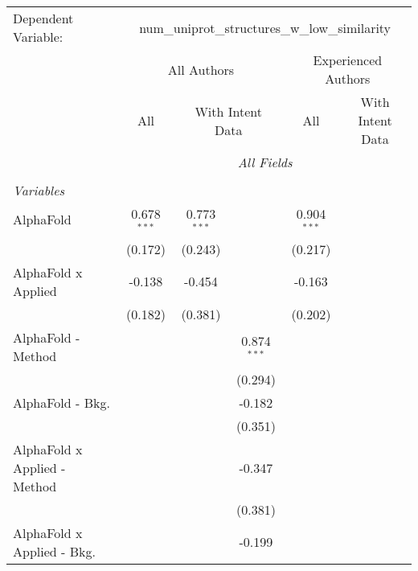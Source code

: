 \begingroup
\centering
\begin{tabular}{lcccccc}
   \tabularnewline \midrule \midrule
   Dependent Variable: & \multicolumn{6}{c}{num\_uniprot\_structures\_w\_low\_similarity}\\
 & \multicolumn{3}{c}{All Authors} & \multicolumn{3}{c}{Experienced Authors} \\
\cmidrule(lr){2-4} \cmidrule(lr){5-7}
 & \multicolumn{1}{c}{All} & \multicolumn{2}{c}{With Intent Data} & \multicolumn{1}{c}{All} & \multicolumn{2}{c}{With Intent Data} \\
\cmidrule(lr){2-2} \cmidrule(lr){3-4} \cmidrule(lr){5-5} \cmidrule(lr){6-7}
 & \multicolumn{6}{c}{\textit{All Fields}} \\ \\
   \emph{Variables}\\
   AlphaFold                      & 0.678$^{***}$  & 0.773$^{***}$ &               & 0.904$^{***}$ &         &   \\   
                                  & (0.172)        & (0.243)       &               & (0.217)       &         &   \\   
   AlphaFold x Applied            & -0.138         & -0.454        &               & -0.163        &         &   \\   
                                  & (0.182)        & (0.381)       &               & (0.202)       &         &   \\   
   AlphaFold - Method             &                &               & 0.874$^{***}$ &               &         &   \\   
                                  &                &               & (0.294)       &               &         &   \\   
   AlphaFold - Bkg.               &                &               & -0.182        &               &         &   \\   
                                  &                &               & (0.351)       &               &         &   \\   
   AlphaFold x Applied - Method   &                &               & -0.347        &               &         &   \\   
                                  &                &               & (0.381)       &               &         &   \\   
   AlphaFold x Applied - Bkg.     &                &               & -0.199        &               &         &   \\   

\end{tabular}
